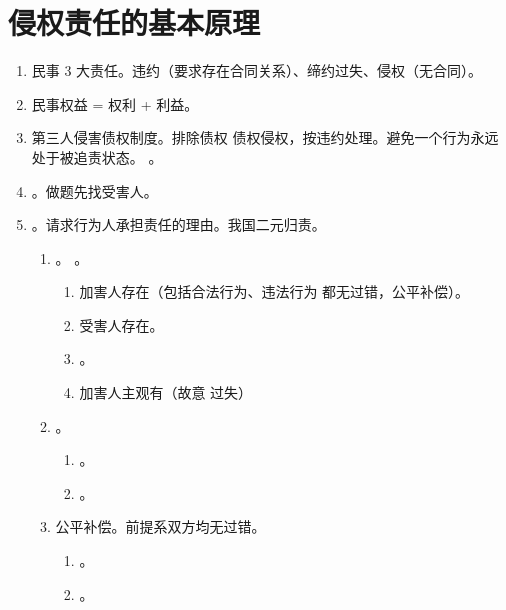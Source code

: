 \section{侵权责任的基本原理}
\begin{enumerate}
  \item 民事 3 大责任。违约（要求存在合同关系）、缔约过失、侵权（无合同）。
  \item 民事权益 = 权利 + 利益。
  \item 第三人侵害债权制度。排除债权 \yjt 债权侵权，按违约处理。避免一个行为永远处于被追责状态。
        。
  \item {}。做题先找受害人。
  \item {}。请求行为人承担责任的理由。我国二元归责。
        \begin{enumerate}
          \item {}。
                。
                \begin{enumerate}
                  \item 加害人存在（包括合法行为、违法行为 \yjt 都无过错，公平补偿）。
                  \item 受害人存在。
                  \item {}。
                  \item 加害人主观有（故意 \hz 过失）
                \end{enumerate}
          \item {}。
                \begin{enumerate}
                  \item {}。
                  \item {}。
                \end{enumerate}
          \item 公平补偿。前提系双方均无过错。
                \begin{enumerate}
                  \item {}。
                  \item {}。

\end{enumerate}
\end{enumerate}
\end{enumerate}
